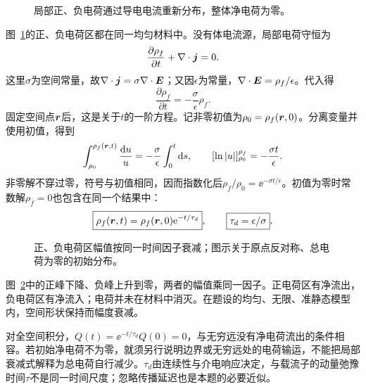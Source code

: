 \begin{figure}[H]\centering
{}
\caption{局部正、负电荷通过导电电流重新分布，整体净电荷为零。}\label{fig:c1-relax-q}
\end{figure}
\begin{solution}
图~\ref{fig:c1-relax-q}的正、负电荷区都在同一均匀材料中。没有体电流源，局部电荷守恒为
\[
 \frac{\partial\rho_f}{\partial t}+\nabla\cdot\bm{j}=0.
\]
这里$\sigma$为空间常量，故$\nabla\cdot\bm{j}=\sigma\nabla\cdot\bm{E}$；又因$\epsilon$为常量，$\nabla\cdot\bm{E}=\rho_f/\epsilon$。代入得
\[
 \frac{\partial\rho_f}{\partial t}=-\frac{\sigma}{\epsilon}\rho_f.
\]
固定空间点$\bm{r}$后，这是关于$t$的一阶方程。记非零初值为$\rho_0=\rho_f(\bm{r},0)$。分离变量并使用初值，得到
\[
 \int_{\rho_0}^{\rho_f(\bm{r},t)}\frac{\mathop{}\!\mathrm d u}{u}
 =-\frac{\sigma}{\epsilon}\int_0^t\mathop{}\!\mathrm d s,
 \qquad
 [\ln|u|]_{\rho_0}^{\rho_f}=-\frac{\sigma t}{\epsilon}.
\]
非零解不穿过零，符号与初值相同，因而指数化后$\rho_f/\rho_0=\ee^{-\sigma t/\epsilon}$。初值为零时常数解$\rho_f=0$也包含在同一个结果中：
\[
 \boxed{\rho_f(\bm{r},t)=\rho_f(\bm{r},0)\mathrm e^{-t/\tau_d}},\qquad
 \boxed{\tau_d=\epsilon/\sigma}.
\]
\begin{figure}[H]\centering
{}
\caption{正、负电荷区幅值按同一时间因子衰减；图示关于原点反对称、总电荷为零的初始分布。}\label{fig:c1-relax-s}
\end{figure}
图~\ref{fig:c1-relax-s}中的正峰下降、负峰上升到零，两者的幅值乘同一因子。正电荷区有净流出，负电荷区有净流入；电荷并未在材料中消灭。在题设的均匀、无限、准静态模型内，空间形状保持而幅度衰减。

对全空间积分，$Q(t)=\ee^{-t/\tau_d}Q(0)=0$，与无穷远没有净电荷流出的条件相容。若初始净电荷不为零，就须另行说明边界或无穷远处的电荷输运，不能把局部衰减式解释为总电荷自行减少。$\tau_d$由连续性与介电响应决定，与载流子的动量弛豫时间$\tau$不是同一时间尺度；忽略传播延迟也是本题的必要近似。
\end{solution}
